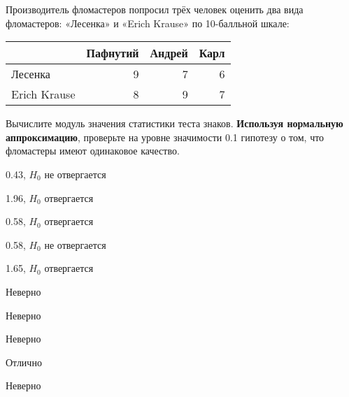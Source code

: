 
\begin{question}
Производитель фломастеров попросил трёх человек оценить два вида
фломастеров: «Лесенка» и «Erich Krause» по 10-балльной шкале:

\begin{center}
\begin{tabular}{lrrr} \toprule
 & Пафнутий  & Андрей & Карл \\
\midrule
Лесенка & 9 & 7 & 6 \\
Erich Krause & 8 & 9 & 7 \\
\bottomrule
\end{tabular}
\end{center}

Вычислите модуль значения статистики теста знаков.
\textbf{Используя нормальную аппроксимацию}, проверьте на уровне
значимости 0.1 гипотезу о том, что фломастеры имеют одинаковое качество.
\begin{answerlist}
  \item 0.43, \(H_0\) не отвергается
  \item 1.96, \(H_0\) отвергается
  \item 0.58, \(H_0\) отвергается
  \item 0.58, \(H_0\) не отвергается
  \item 1.65, \(H_0\) отвергается
\end{answerlist}
\end{question}

\begin{solution}
\begin{answerlist}
  \item Неверно
  \item Неверно
  \item Неверно
  \item Отлично
  \item Неверно
\end{answerlist}
\end{solution}

